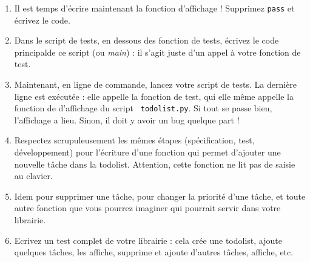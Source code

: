 \documentclass[11pt,a4paper]{article}
\newcommand{\checkbox}{$\square$ \smallskip}
\newcounter{exo} \setcounter{exo}{0}
\newenvironment{action}{%
    \begin{enumerate}[\numerotation] \addtocounter{exo}{-1}%
        }{%
    \end{enumerate}
}
\newcommand{\numexoa}{\theexo \addtocounter{exo}{1}}
\newcommand{\numerotation}{\checkbox \smallskip \numexoa.}
\begin{document}
\begin{action}
  note : on ne peut pas faire un {\tt assert} pour vérifier l'affichage.
  Il faudra regarder avec nos yeux si ça correspond bien à ce qu'on veut.

\item Il est temps d'écrire maintenant la fonction d'affichage ! Supprimez
  {\tt pass} et écrivez le code.

\item Dans le script de tests, en dessous des fonction de tests, écrivez
  le \og code principal\fg de ce script (ou {\it main}) : il s'agit juste
  d'un appel à votre fonction de test.

\item Maintenant, en ligne de commande, lancez votre script de tests. La
  dernière ligne est exécutée : elle appelle la fonction de test, qui
  elle même appelle la fonction de d'affichage du script {\tt
    todolist.py}.
  Si tout se passe bien, l'affichage a lieu. Sinon, il doit y avoir un
  bug quelque part !

\item Respectez scrupuleusement les mêmes étapes (spécification, test,
  développement) pour l'écriture d'une
  fonction qui permet d'ajouter une nouvelle tâche dans la todolist. Attention,
  cette fonction ne lit pas de saisie au clavier.

\item Idem pour supprimer une tâche, pour changer la priorité d'une tâche, et toute autre fonction que vous pourrez imaginer qui pourrait servir dans votre librairie.

\item Ecrivez un test complet de votre librairie : cela crée une todolist, ajoute quelques tâches, les affiche, supprime et ajoute d'autres tâches, affiche, etc.
\end{action}
\end{document}
